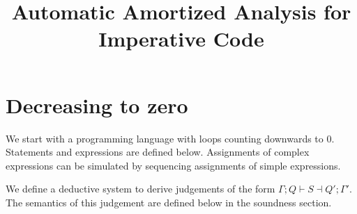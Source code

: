 \documentclass[10pt]{article}
\title{Automatic Amortized Analysis for Imperative Code}
\date{}
\author{}
\theoremstyle{newstyle}
\begin{document}
\maketitle

\section{Decreasing to zero}

We start with a programming language with loops counting
downwards to 0.  Statements and expressions are defined
below.  Assignments of complex expressions can be simulated
by sequencing assignments of simple expressions.
%
%
We define a deductive system to derive judgements of the
form $\Gamma; Q \vdash S \dashv Q'; \Gamma'$.  The semantics
of this judgement are defined below in the soundness section.

\end{document}
